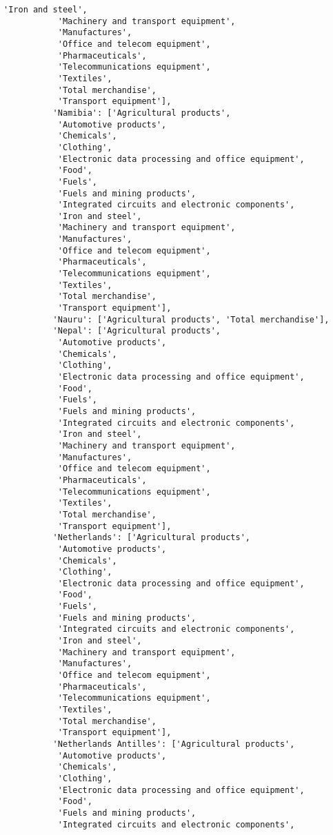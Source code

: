 \documentclass[11pt]{article}
\begin{document}
\begin{Verbatim}[commandchars=\\\{\}]
           'Iron and steel',
           'Machinery and transport equipment',
           'Manufactures',
           'Office and telecom equipment',
           'Pharmaceuticals',
           'Telecommunications equipment',
           'Textiles',
           'Total merchandise',
           'Transport equipment'],
          'Namibia': ['Agricultural products',
           'Automotive products',
           'Chemicals',
           'Clothing',
           'Electronic data processing and office equipment',
           'Food',
           'Fuels',
           'Fuels and mining products',
           'Integrated circuits and electronic components',
           'Iron and steel',
           'Machinery and transport equipment',
           'Manufactures',
           'Office and telecom equipment',
           'Pharmaceuticals',
           'Telecommunications equipment',
           'Textiles',
           'Total merchandise',
           'Transport equipment'],
          'Nauru': ['Agricultural products', 'Total merchandise'],
          'Nepal': ['Agricultural products',
           'Automotive products',
           'Chemicals',
           'Clothing',
           'Electronic data processing and office equipment',
           'Food',
           'Fuels',
           'Fuels and mining products',
           'Integrated circuits and electronic components',
           'Iron and steel',
           'Machinery and transport equipment',
           'Manufactures',
           'Office and telecom equipment',
           'Pharmaceuticals',
           'Telecommunications equipment',
           'Textiles',
           'Total merchandise',
           'Transport equipment'],
          'Netherlands': ['Agricultural products',
           'Automotive products',
           'Chemicals',
           'Clothing',
           'Electronic data processing and office equipment',
           'Food',
           'Fuels',
           'Fuels and mining products',
           'Integrated circuits and electronic components',
           'Iron and steel',
           'Machinery and transport equipment',
           'Manufactures',
           'Office and telecom equipment',
           'Pharmaceuticals',
           'Telecommunications equipment',
           'Textiles',
           'Total merchandise',
           'Transport equipment'],
          'Netherlands Antilles': ['Agricultural products',
           'Automotive products',
           'Chemicals',
           'Clothing',
           'Electronic data processing and office equipment',
           'Food',
           'Fuels and mining products',
           'Integrated circuits and electronic components',

\end{Verbatim}
\end{document}
